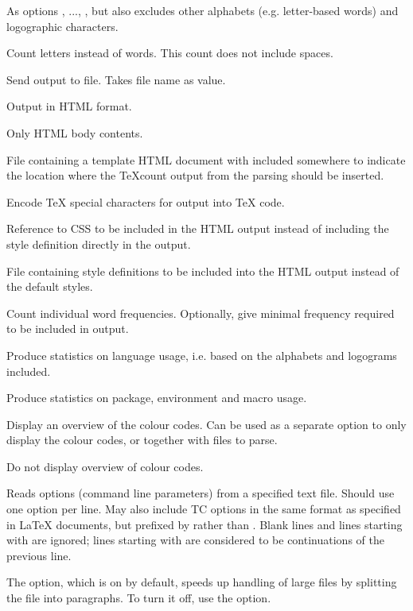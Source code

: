 \begin{description}
As options , ..., , but also excludes other alphabets (e.g. letter-based words) and logographic characters.

Count letters instead of words. This count does not include spaces.

\option[-out=]Send output to file. Takes file name as value.

\option[-html]Output in HTML format.

\option[-htmlcore]Only HTML body contents.

\option[-htmlfile=]File containing a template HTML document with  included somewhere to indicate the location where the TeXcount output from the parsing should be inserted.

\option[-tex]Encode \TeX{} special characters for output into \TeX{} code.

\option[-css=]Reference to CSS to be included in the HTML output instead of including the style definition directly in the output.

\option[-cssfile=, -css=file:]File containing style definitions to be included into the HTML output instead of the default styles.

\option[-freq\alt{=\#}]Count individual word frequencies. Optionally, give minimal frequency required to be included in output.

\option[-stat]Produce statistics on language usage, i.e. based on the alphabets and logograms included.

Produce statistics on package, environment and macro usage. 

\option[-codes]Display an overview of the colour codes. Can be used as a separate option to only display the colour codes, or together with files to parse.

\option[-nocodes]Do not display overview of colour codes.

\option[-opt=, -optionfile=]Reads options (command line parameters) from a specified text file. Should use one option per line. May also include TC options in the same format as specified in \LaTeX{} documents, but prefixed by \code{\%} rather than . Blank lines and lines starting with \code{\#} are ignored; lines starting with \code{\bs{}} are considered to be continuations of the previous line.

The  option, which is on by default, speeds up handling of large files by splitting the file into paragraphs. To turn it off, use the  option.


\end{description}
